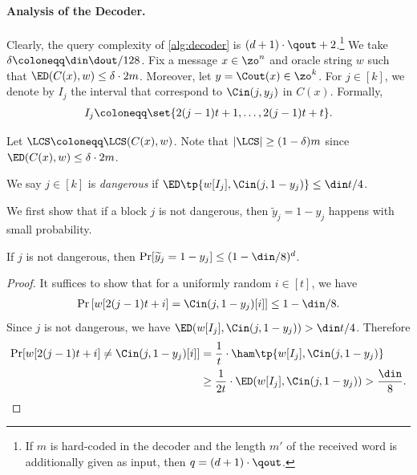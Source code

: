 \paragraph{Analysis of the Decoder.}
Clearly, the query complexity of \cref{alg:decoder} is $(d+1) \cdot \qout + 2$.\footnote{If $m$ is hard-coded in the decoder and the length $m'$ of the received word is additionally given as input, then $q = (d+1)\cdot \qout$.} 
We take $\delta\coloneqq \din\dout/128$.
Fix a message $x \in \zo^n$ and oracle string $w$ such that $\ED(C(x), w) \leq \delta \cdot 2m$.
Moreover, let $y = \Cout(x) \in \zo^k$.
For $j \in [k]$, we denote by $I_j$ the interval that correspond to $\Cin(j, y_j)$ in $C(x)$. Formally, 
\begin{align*}
	I_j \coloneqq \set{2(j-1)t+1, \dotsc, 2(j-1)t + t}.
\end{align*}




Let $\LCS \coloneqq \LCS(C(x), w)$.
Note that $|\LCS| \geq (1-\delta)m$ since $\ED(C(x), w) \leq \delta \cdot 2m$.
\begin{definition}
	We say $j\in [k]$ is \emph{dangerous} if $\ED\tp{w[I_j], \Cin(j, 1-y_j)} \le \din t/4$.
\end{definition}
We first show that if a block $j$ is not dangerous, then $\widetilde{y}_j = 1-y_j$ happens with small probability.
\begin{proposition}\label{prop:dangerous-bad}
	If $j$ is not dangerous, then $\Pr[\widetilde{y}_j = 1-y_j] \leq (1-\din/8)^d$.
\end{proposition}
\begin{proof}
	It suffices to show that for a uniformly random $i \in [t]$, we have 
	\begin{align*}
		\Pr\left[w[2(j-1)t+i] = \Cin(j,1-y_j)[i]\right] \le 1-\din/8.
	\end{align*}
	Since $j$ is not dangerous, we have $\ED(w[I_j], \Cin(j,1-y_j))>\din t/4$. Therefore
	\begin{align*}
		\Pr[w[{2(j-1)t+i}] \neq \Cin(j,1-y_j)[i]] &= \frac{1}{t} \cdot \ham\tp{w[{I_j}], \Cin(j,1-y_j)}\\ 
		&\ge \frac{1}{2t} \cdot \ED(w[I_j], \Cin(j,1-y_j))
		> \frac{\din}{8}.\qedhere
	\end{align*}
\end{proof}


